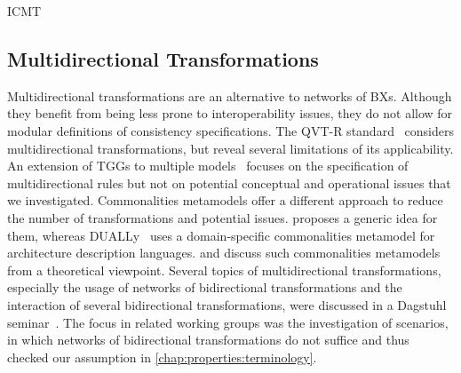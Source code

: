 \begin{copiedFrom}{ICMT}
\subsection*{Multidirectional Transformations}
Multidirectional transformations 
are an alternative to networks of \acp{BX}.
Although they benefit from being less prone to interoperability issues, they do not allow for modular definitions of consistency specifications.
The QVT-R standard~\cite{qvt} considers multidirectional transformations, but \textcite{macedo2014a} reveal several limitations of its applicability.
An extension of \acp{TGG} to multiple models~\cite{trollmann2015a, trollmann2016a} focuses on the specification of multidirectional rules but not on potential conceptual and operational issues that we investigated.
Commonalities metamodels offer a different approach to reduce the number of transformations and potential issues.
\textcite{gleitze2017a} proposes a generic idea for them, whereas DUALLy~\cite{malavolta2010a, eramo2012a} uses a domain-specific commonalities metamodel for architecture description languages.
\textcite{stunkel2018a} and \textcite{diskin2018a} discuss such commonalities metamodels from a theoretical viewpoint.
Several topics of multidirectional transformations, especially the usage of networks of bidirectional transformations and the interaction of several bidirectional transformations, were discussed in a Dagstuhl seminar~\cite{cleve2019dagstuhl}.
The focus in related working groups was the investigation of scenarios, in which networks of bidirectional transformations do not suffice and thus checked our assumption in \autoref{chap:properties:terminology}.



\end{copiedFrom}
